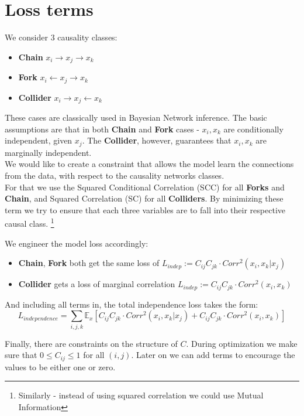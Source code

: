 \documentclass{article}
\newcommand{\EE}{\mathbb{E}}
\begin{document}
\section{Loss terms}
We consider 3 causality classes:
\begin{itemize}
    \item \textbf{Chain} $x_i \to x_j \to x_k$
    \item \textbf{Fork} $x_i \leftarrow x_j \rightarrow x_k$
    \item \textbf{Collider} $x_i \rightarrow x_j \leftarrow x_k$
\end{itemize}
These cases are classically used in Bayesian Network inference. The basic assumptions are that in both \textbf{Chain} and \textbf{Fork} cases - $x_i, x_k$ are conditionally independent, given $x_j$. The \textbf{Collider}, however, guarantees that $x_i, x_k$ are marginally independent. \\
We would like to create a constraint that allows the model learn the connections from the data, with respect to the causality networks classes. \\
For that we use the Squared Conditional Correlation (SCC) for all \textbf{Forks} and \textbf{Chain}, and Squared Correlation (SC) for all \textbf{Colliders}. By minimizing these term we try to ensure that each three variables are to fall into their respective causal class. \footnote{Similarly - instead of using squared correlation we could use Mutual Information} \par
We engineer the model loss accordingly:
\begin{itemize}
	\item \textbf{Chain}, \textbf{Fork} both get the same loss of 
	$L_{indep} := C_{ij}C_{jk} \cdot Corr^2(x_i, x_k | x_j)$ 
	\item \textbf{Collider} gets a loss of marginal correlation 
	$L_{indep} := C_{ij}C_{jk} \cdot Corr^2(x_i, x_k)$ 
\end{itemize}
And including all terms in, the total independence loss takes the form:
\begin{equation}
	L_{independence} = \sum_{i, j, k} \EE_x \left[C_{ij}C_{jk} \cdot Corr^2(x_i, x_k | x_j) + C_{ij}C_{jk} \cdot Corr^2(x_i, x_k)\right]
\end{equation}
\par

Finally, there are constraints on the structure of $C$.
During optimization we make sure that $0 \leq C_{ij} \leq 1$ for all $(i,j)$.
Later on we can add terms to encourage the values to be either one or zero.
\end{document}
